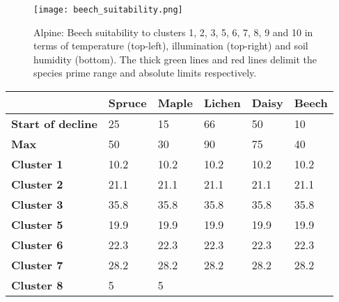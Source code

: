 \begin{figure}
\center
	\texttt{[image: beech\_suitability.png]}
	\caption{ Alpine: Beech suitability to clusters 1, 2, 3, 5, 6, 7, 8, 9 and 10 in terms of temperature (top-left), illumination (top-right) and soil humidity (bottom). The thick green lines and red lines delimit the species prime range and absolute limits respectively.}
	\label{fig:results_alpine_beech_suitability}
\end{figure}

\begin{table}[h]
  \centering
	    \begin{tabular}{|p{2cm}|p{2.5cm}|p{2.5cm}|p{2.5cm}|p{2.5cm}|p{2.5cm}|}
		\hline	
  	     & \textbf{Spruce} & \textbf{Maple} & \textbf{Lichen} & \textbf{Daisy} & \textbf{Beech}\\
  	    \hline	
		\textbf{Start of decline} & 
		25 & 
		15 & 
		66 & 
		50 & 
		10 \\
		\hline
		\textbf{Max} & 
		50 & 
		30 & 
		90 & 
		75 & 
		40 \\
		\hline
		\textbf{Cluster 1} & 
		\cellcolor{color_green}10.2 &
		\cellcolor{color_green}10.2 &
		\cellcolor{color_green}10.2 &
		\cellcolor{color_green}10.2 &
		\cellcolor{color_orange}10.2 \\
		\hline
		\textbf{Cluster 2} & 
		\cellcolor{color_orange}21.1 &
		\cellcolor{color_orange}21.1 &
		\cellcolor{color_green}21.1 &
		\cellcolor{color_green}21.1 &
		\cellcolor{color_orange}21.1 \\
		\hline
		\textbf{Cluster 3} & 
		\cellcolor{color_orange}35.8 & 
		\cellcolor{color_red}35.8 & 
		\cellcolor{color_green}35.8 & 
		\cellcolor{color_green}35.8 & 
		\cellcolor{color_orange}35.8\\
		\hline
		\textbf{Cluster 5} & 
		\cellcolor{color_green}19.9 & 
		\cellcolor{color_orange}19.9 & 
		\cellcolor{color_green}19.9 & 
		\cellcolor{color_green}19.9 & 
		\cellcolor{color_orange}19.9\\
		\hline
		\textbf{Cluster 6} & 
		\cellcolor{color_green}22.3 & 
		\cellcolor{color_orange}22.3 & 
		\cellcolor{color_green}22.3 & 
		\cellcolor{color_green}22.3 & 
		\cellcolor{color_orange}22.3\\
		\hline
		\textbf{Cluster 7} & 
		\cellcolor{color_orange}28.2 & 
		\cellcolor{color_orange}28.2 & 
		\cellcolor{color_green}28.2 & 
		\cellcolor{color_green}28.2 & 
		\cellcolor{color_orange}28.2\\
		\hline
		\textbf{Cluster 8} & 
		\cellcolor{color_green}5 & 
		\cellcolor{color_green}5 & 

\end{tabular}
\end{table}
